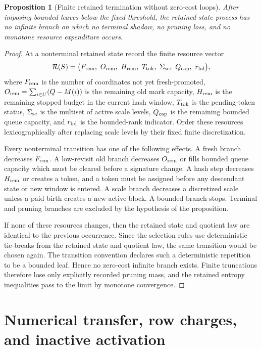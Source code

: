 \documentclass[11pt]{article}
\newtheorem{proposition}[theorem]{Proposition}
\theoremstyle{remark}
\begin{document}
\begin{proposition}[Finite retained termination without zero-cost loops]\label{prop:crit-no-loop}
After imposing bounded leaves below the fixed threshold, the retained-state process has no infinite branch on which no terminal shadow, no pruning loss, and no monotone resource expenditure occurs.
\end{proposition}

\begin{proof}
At a nonterminal retained state record the finite resource vector
\[
\mathcal R(S)=\bigl(F_{\rm rem},\ O_{\rm rem},\ H_{\rm rem},\ T_{\rm tok},\ \Sigma_{\rm sc},\ Q_{\rm cap},\ r_{\rm bd}\bigr),
\]
where $F_{\rm rem}$ is the number of coordinates not yet fresh-promoted, $O_{\rm rem}=\sum_{i\in U}(Q-M(i))$ is the remaining old mark capacity, $H_{\rm rem}$ is the remaining stopped budget in the current hash window, $T_{\rm tok}$ is the pending-token status, $\Sigma_{\rm sc}$ is the multiset of active scale levels, $Q_{\rm cap}$ is the remaining bounded queue capacity, and $r_{\rm bd}$ is the bounded-rank indicator.  Order these resources lexicographically after replacing scale levels by their fixed finite discretization.

Every nonterminal transition has one of the following effects.  A fresh branch decreases $F_{\rm rem}$.  A low-revisit old branch decreases $O_{\rm rem}$ or fills bounded queue capacity which must be cleared before a signature change.  A hash step decreases $H_{\rm rem}$ or creates a token, and a token must be assigned before any descendant state or new window is entered.  A scale branch decreases a discretized scale unless a paid birth creates a new active block.  A bounded branch stops.  Terminal and pruning branches are excluded by the hypothesis of the proposition.

If none of these resources changes, then the retained state and quotient law are identical to the previous occurrence.  Since the selection rules use deterministic tie-breaks from the retained state and quotient law, the same transition would be chosen again.  The transition convention declares such a deterministic repetition to be a bounded leaf.  Hence no zero-cost infinite branch exists.  Finite truncations therefore lose only explicitly recorded pruning mass, and the retained entropy inequalities pass to the limit by monotone convergence.
\end{proof}



\section{Numerical transfer, row charges, and inactive activation}\label{app:numerical-details}
\end{document}
